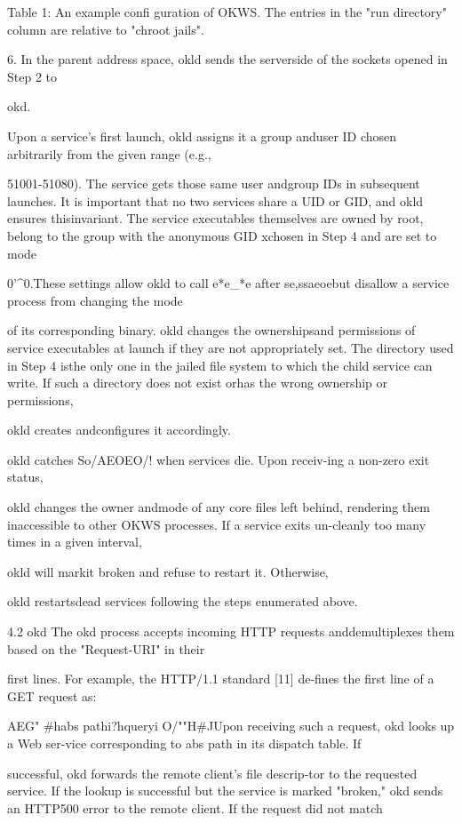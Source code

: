 Table 1: An example confi guration of OKWS. The entries in
the "run directory" column are relative to "chroot jails".

6. In the parent address space, okld sends the serverside of the sockets opened in Step 2 to

okd.

Upon a service's first launch, okld assigns it a group anduser ID chosen arbitrarily from the given range (e.g.,

51001-51080). The service gets those same user andgroup IDs in subsequent launches. It is important that no
two services share a UID or GID, and okld ensures thisinvariant. The service executables themselves are owned
by root, belong to the group with the anonymous GID xchosen in Step 4 and are set to mode

0'^0.These settings allow okld to call
e*e_*e after se,ssaeoebut disallow a service process from changing the mode

of its corresponding binary. okld changes the ownershipsand permissions of service executables at launch if they
are not appropriately set. The directory used in Step 4 isthe only one in the jailed file system to which the child
service can write. If such a directory does not exist orhas the wrong ownership or permissions,

okld creates andconfigures it accordingly.

okld catches So/AEOEO/! when services die. Upon receiv-ing a non-zero exit status,

okld changes the owner andmode of any core files left behind, rendering them inaccessible to other OKWS processes. If a service exits un-cleanly too many times in a given interval,

okld will markit broken and refuse to restart it. Otherwise,

okld restartsdead services following the steps enumerated above.

4.2 okd
The okd process accepts incoming HTTP requests anddemultiplexes them based on the "Request-URI" in their

first lines. For example, the HTTP/1.1 standard [11] de-fines the first line of a GET request as:

AEG" #habs pathi?hqueryi O/""H#^^
Upon receiving such a request, okd looks up a Web ser-vice corresponding to abs path in its dispatch table. If

successful, okd forwards the remote client's file descrip-tor to the requested service. If the lookup is successful
but the service is marked "broken," okd sends an HTTP500 error to the remote client. If the request did not match

